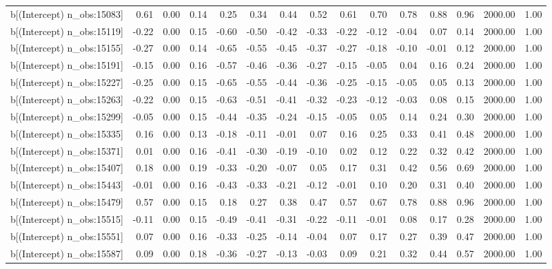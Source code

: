 \begin{table}[ht]
\begin{tabular}{rrrrrrrrrrrrrrr}
  b[(Intercept) n\_obs:15083] & 0.61 & 0.00 & 0.14 & 0.25 & 0.34 & 0.44 & 0.52 & 0.61 & 0.70 & 0.78 & 0.88 & 0.96 & 2000.00 & 1.00 \\ 
  b[(Intercept) n\_obs:15119] & -0.22 & 0.00 & 0.15 & -0.60 & -0.50 & -0.42 & -0.33 & -0.22 & -0.12 & -0.04 & 0.07 & 0.14 & 2000.00 & 1.00 \\ 
  b[(Intercept) n\_obs:15155] & -0.27 & 0.00 & 0.14 & -0.65 & -0.55 & -0.45 & -0.37 & -0.27 & -0.18 & -0.10 & -0.01 & 0.12 & 2000.00 & 1.00 \\ 
  b[(Intercept) n\_obs:15191] & -0.15 & 0.00 & 0.16 & -0.57 & -0.46 & -0.36 & -0.27 & -0.15 & -0.05 & 0.04 & 0.16 & 0.24 & 2000.00 & 1.00 \\ 
  b[(Intercept) n\_obs:15227] & -0.25 & 0.00 & 0.15 & -0.65 & -0.55 & -0.44 & -0.36 & -0.25 & -0.15 & -0.05 & 0.05 & 0.13 & 2000.00 & 1.00 \\ 
  b[(Intercept) n\_obs:15263] & -0.22 & 0.00 & 0.15 & -0.63 & -0.51 & -0.41 & -0.32 & -0.23 & -0.12 & -0.03 & 0.08 & 0.15 & 2000.00 & 1.00 \\ 
  b[(Intercept) n\_obs:15299] & -0.05 & 0.00 & 0.15 & -0.44 & -0.35 & -0.24 & -0.15 & -0.05 & 0.05 & 0.14 & 0.24 & 0.30 & 2000.00 & 1.00 \\ 
  b[(Intercept) n\_obs:15335] & 0.16 & 0.00 & 0.13 & -0.18 & -0.11 & -0.01 & 0.07 & 0.16 & 0.25 & 0.33 & 0.41 & 0.48 & 2000.00 & 1.00 \\ 
  b[(Intercept) n\_obs:15371] & 0.01 & 0.00 & 0.16 & -0.41 & -0.30 & -0.19 & -0.10 & 0.02 & 0.12 & 0.22 & 0.32 & 0.42 & 2000.00 & 1.00 \\ 
  b[(Intercept) n\_obs:15407] & 0.18 & 0.00 & 0.19 & -0.33 & -0.20 & -0.07 & 0.05 & 0.17 & 0.31 & 0.42 & 0.56 & 0.69 & 2000.00 & 1.00 \\ 
  b[(Intercept) n\_obs:15443] & -0.01 & 0.00 & 0.16 & -0.43 & -0.33 & -0.21 & -0.12 & -0.01 & 0.10 & 0.20 & 0.31 & 0.40 & 2000.00 & 1.00 \\ 
  b[(Intercept) n\_obs:15479] & 0.57 & 0.00 & 0.15 & 0.18 & 0.27 & 0.38 & 0.47 & 0.57 & 0.67 & 0.78 & 0.88 & 0.96 & 2000.00 & 1.00 \\ 
  b[(Intercept) n\_obs:15515] & -0.11 & 0.00 & 0.15 & -0.49 & -0.41 & -0.31 & -0.22 & -0.11 & -0.01 & 0.08 & 0.17 & 0.28 & 2000.00 & 1.00 \\ 
  b[(Intercept) n\_obs:15551] & 0.07 & 0.00 & 0.16 & -0.33 & -0.25 & -0.14 & -0.04 & 0.07 & 0.17 & 0.27 & 0.39 & 0.47 & 2000.00 & 1.00 \\ 
  b[(Intercept) n\_obs:15587] & 0.09 & 0.00 & 0.18 & -0.36 & -0.27 & -0.13 & -0.03 & 0.09 & 0.21 & 0.32 & 0.44 & 0.57 & 2000.00 & 1.00 \\ 

\end{tabular}
\end{table}
